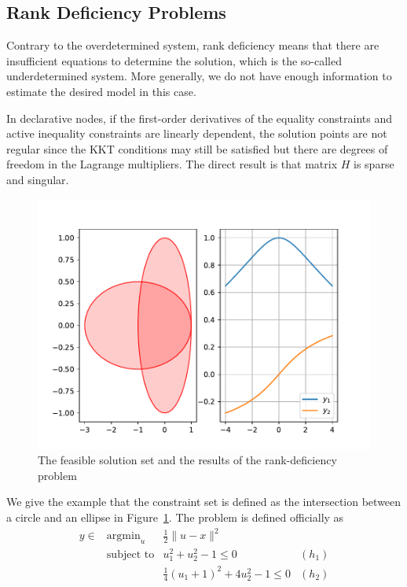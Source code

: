 \subsection{Rank Deficiency Problems}
Contrary to the overdetermined system, rank deficiency means that there are insufficient equations to determine the solution, which is the so-called underdetermined system. More generally, we do not have enough information to estimate the desired model in this case. 
\par In declarative nodes, if the first-order derivatives of the equality constraints and active inequality constraints are linearly dependent, the solution points are not regular since the KKT conditions may still be satisfied but there are degrees of freedom in the Lagrange multipliers. The direct result is that matrix $H$ is sparse and singular. 
\begin{figure}[t]
    \label{fig:rank-deficiency}
    \centering
    \includegraphics[page=1, width=.8\textwidth]{figs/rankdeficient.pdf}
    \caption{The feasible solution set and the results of the rank-deficiency problem}
\end{figure}
\par We give the example that the constraint set is defined as the intersection between a circle and an ellipse in Figure~\ref{fig:rank-deficiency}. The problem is defined officially as
\begin{equation}
    \begin{array}{llll}
        y \in & \text{argmin}_u & \frac{1}{2} \|u - x\|^2 \\
        & \text{subject to} & u_1^2 + u_2^2 - 1 \leq 0 & (h_1) \\
        & & \frac{1}{4}(u_1 + 1)^2 + 4 u_2^2 - 1 \leq 0 & (h_2)
    \end{array}
\end{equation}
